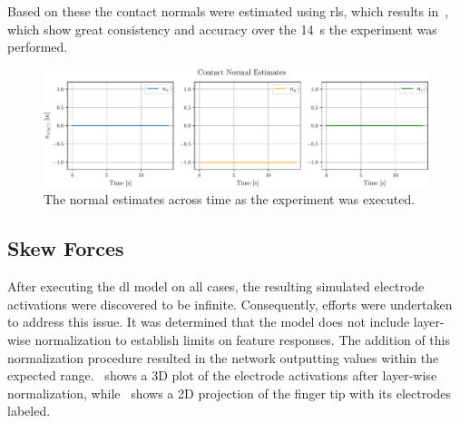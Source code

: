 Based on these the contact normals were estimated using \gls{rls}, which results in~, which show great consistency and accuracy over the \SI{14}{\second} the experiment was performed.

\begin{figure}[!h]
	\begin{center}
		\includegraphics[width=\textwidth]{chapters/1-tactile-perception/fig/matplotlib/contact-normal-estimates.pdf}
	\end{center}
	\caption{The normal estimates across time as the experiment was executed.}
	\label{fig:contact-normal-estimates}
\end{figure}

\subsection{Skew Forces} \label{sec:1-tactile-perception-results-skew-forces}

After executing the \gls{dl} model on all cases, the resulting simulated electrode activations were discovered to be infinite. Consequently, efforts were undertaken to address this issue. It was determined that the model does not include layer-wise normalization to establish limits on feature responses. The addition of this normalization procedure resulted in the network outputting values within the expected range.~ shows a 3D plot of the electrode activations after layer-wise normalization, while~ shows a 2D projection of the finger tip with its electrodes labeled.

